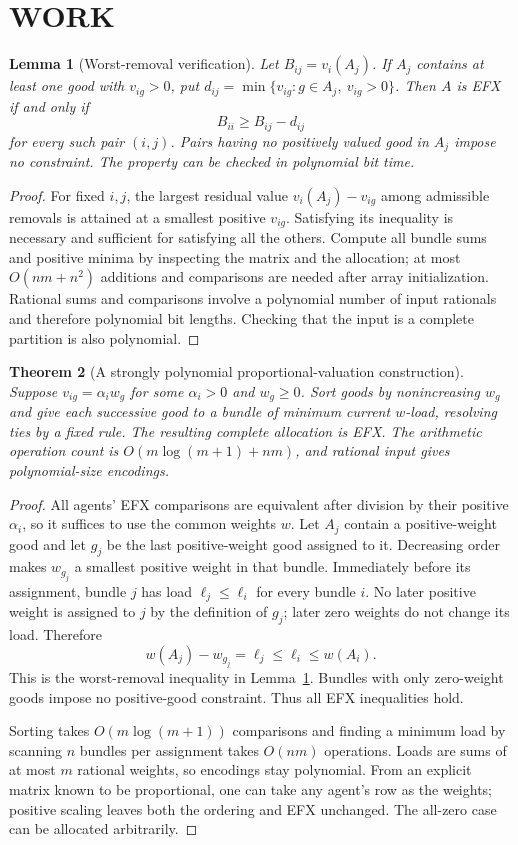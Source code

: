\documentclass[11pt,a4paper]{article}
\newtheorem{theorem}{Theorem}[section]
\newtheorem{lemma}[theorem]{Lemma}
\theoremstyle{definition}\newtheorem{definition}[theorem]{Definition}
\theoremstyle{remark}\newtheorem{remark}[theorem]{Remark}
\newcommand{\1}{\mathbf 1}
\begin{document}
\section{WORK}
\begin{lemma}[Worst-removal verification]\label{lem:verify}
Let $B_{ij}=v_i(A_j)$. If $A_j$ contains at least one good with $v_{ig}>0$, put $d_{ij}=\min\{v_{ig}:g\in A_j,\ v_{ig}>0\}$. Then $A$ is EFX if and only if
\[
 B_{ii}\ge B_{ij}-d_{ij}
\]
for every such pair $(i,j)$. Pairs having no positively valued good in $A_j$ impose no constraint. The property can be checked in polynomial bit time.
\end{lemma}
\begin{proof}
For fixed $i,j$, the largest residual value $v_i(A_j)-v_{ig}$ among admissible removals is attained at a smallest positive $v_{ig}$. Satisfying its inequality is necessary and sufficient for satisfying all the others. Compute all bundle sums and positive minima by inspecting the matrix and the allocation; at most $O(nm+n^2)$ additions and comparisons are needed after array initialization. Rational sums and comparisons involve a polynomial number of input rationals and therefore polynomial bit lengths. Checking that the input is a complete partition is also polynomial.
\end{proof}

\begin{theorem}[A strongly polynomial proportional-valuation construction]\label{thm:common}
Suppose $v_{ig}=\alpha_iw_g$ for some $\alpha_i>0$ and $w_g\ge0$. Sort goods by nonincreasing $w_g$ and give each successive good to a bundle of minimum current $w$-load, resolving ties by a fixed rule. The resulting complete allocation is EFX. The arithmetic operation count is $O(m\log(m+1)+nm)$, and rational input gives polynomial-size encodings.
\end{theorem}
\begin{proof}
All agents' EFX comparisons are equivalent after division by their positive $\alpha_i$, so it suffices to use the common weights $w$. Let $A_j$ contain a positive-weight good and let $g_j$ be the last positive-weight good assigned to it. Decreasing order makes $w_{g_j}$ a smallest positive weight in that bundle. Immediately before its assignment, bundle $j$ has load $\ell_j\le\ell_i$ for every bundle $i$. No later positive weight is assigned to $j$ by the definition of $g_j$; later zero weights do not change its load. Therefore
\[
 w(A_j)-w_{g_j}=\ell_j\le\ell_i\le w(A_i).
\]
This is the worst-removal inequality in Lemma~\ref{lem:verify}. Bundles with only zero-weight goods impose no positive-good constraint. Thus all EFX inequalities hold.

Sorting takes $O(m\log(m+1))$ comparisons and finding a minimum load by scanning $n$ bundles per assignment takes $O(nm)$ operations. Loads are sums of at most $m$ rational weights, so encodings stay polynomial. From an explicit matrix known to be proportional, one can take any agent's row as the weights; positive scaling leaves both the ordering and EFX unchanged. The all-zero case can be allocated arbitrarily.
\end{proof}
\end{document}
